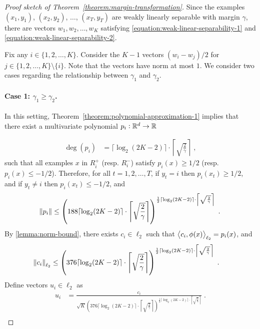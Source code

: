 \begin{proof}[Proof sketch of Theorem~\ref{theorem:margin-transformation}]
Since the examples $(x_1, y_1)$, $(x_2, y_2)$, $\dots$, $(x_T, y_T)$ are weakly
linearly separable with margin $\gamma$, there are vectors $w_1, w_2, \dots, w_K$
satisfying \eqref{equation:weak-linear-separability-1} and
\eqref{equation:weak-linear-separability-2}.

Fix any $i \in \{1,2,\dots,K\}$. Consider the $K-1$ vectors $(w_i - w_j)/2$ for
$j \in \{1,2,\dots,K\} \setminus \{i\}$. Note that the vectors have norm at most
$1$. We consider two cases regarding the relationship between $\gamma_1$ and
$\gamma_2$.

\paragraph{Case 1: $\gamma_1 \geq \gamma_2$.} In this setting,
Theorem~\ref{theorem:polynomial-approximation-1} implies that there exist a
multivariate polynomial $p_i:\mathbb{R}^d \to \mathbb{R}$

\begin{align*}
\deg(p_i) & = \lceil \log_2(2K-2) \rceil \cdot \left\lceil \sqrt{\frac{2}{\gamma}} \right\rceil \; ,
\end{align*}
such that all examples $x$ in $R_i^+$ (resp. $R_i^-$) satisfy $p_i(x) \geq 1/2$
(resp. $p_i(x) \leq -1/2$).
Therefore, for all $t=1,2,\dots,T$, if $y_t = i$ then $p_i(x_t) \ge 1/2$,
 and if $y_t \neq i$ then $p_i(x_t) \le -1/2$, and
\begin{align*}
\norm{p_i} & \le \left(188 \lceil \log_2(2K-2) \rceil \cdot \left \lceil \sqrt{\frac{2}{\gamma}} \right \rceil \right)^{\frac{1}{2} \lceil \log_2(2K-2) \rceil
\cdot \left \lceil \sqrt{\frac{2}{\gamma}} \right \rceil} \; . \\
\end{align*}
By \autoref{lemma:norm-bound}, there exists $c_i \in \ell_2$ such that
$\left\langle c_i, \phi(x) \right\rangle_{\ell_2} = p_i(x)$, and
\begin{align*}
\norm{c_i}_{\ell_2}
& \le \left(376 \lceil \log_2(2K-2) \rceil \cdot \left \lceil \sqrt{\frac{2}{\gamma}} \right \rceil \right)^{\frac{1}{2} \lceil \log_2(2K-2) \rceil
\cdot \left \lceil \sqrt{\frac{2}{\gamma}} \right \rceil} \; .
\end{align*}
Define vectors $u_i \in \ell_2$ as
\begin{align*}
u_i & = \frac{c_i}{\sqrt{K} \left(376 \lceil \log_2(2K-2) \rceil \cdot \left \lceil \sqrt{\frac{2}{\gamma}} \right \rceil \right)^{\frac{1}{2} \lceil \log_2(2K-2) \rceil
\cdot \left \lceil \sqrt{\frac{2}{\gamma}} \right \rceil}} \; . \\
\end{align*}


\end{proof}
